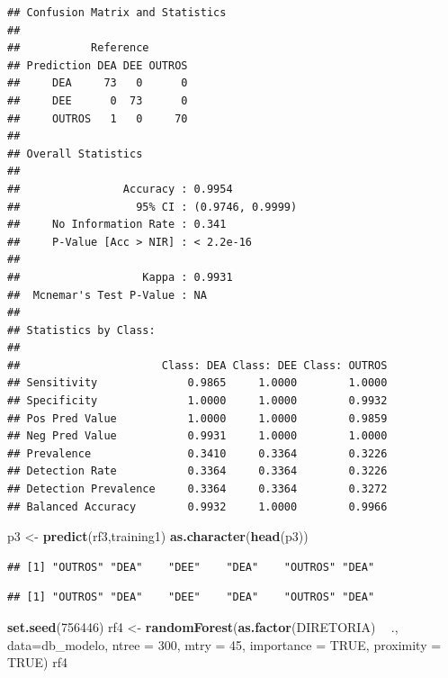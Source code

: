 \documentclass[]{article}
\newenvironment{Shaded}{\begin{snugshade}}{\end{snugshade}}
\newcommand{\KeywordTok}[1]{\textcolor[rgb]{0.13,0.29,0.53}{\textbf{#1}}}
\newcommand{\DataTypeTok}[1]{\textcolor[rgb]{0.13,0.29,0.53}{#1}}
\newcommand{\DecValTok}[1]{\textcolor[rgb]{0.00,0.00,0.81}{#1}}
\newcommand{\StringTok}[1]{\textcolor[rgb]{0.31,0.60,0.02}{#1}}
\newcommand{\OtherTok}[1]{\textcolor[rgb]{0.56,0.35,0.01}{#1}}
\newcommand{\OperatorTok}[1]{\textcolor[rgb]{0.81,0.36,0.00}{\textbf{#1}}}
\newcommand{\NormalTok}[1]{#1}
\begin{document}
\begin{verbatim}
## Confusion Matrix and Statistics
## 
##           Reference
## Prediction DEA DEE OUTROS
##     DEA     73   0      0
##     DEE      0  73      0
##     OUTROS   1   0     70
## 
## Overall Statistics
##                                           
##                Accuracy : 0.9954          
##                  95% CI : (0.9746, 0.9999)
##     No Information Rate : 0.341           
##     P-Value [Acc > NIR] : < 2.2e-16       
##                                           
##                   Kappa : 0.9931          
##  Mcnemar's Test P-Value : NA              
## 
## Statistics by Class:
## 
##                      Class: DEA Class: DEE Class: OUTROS
## Sensitivity              0.9865     1.0000        1.0000
## Specificity              1.0000     1.0000        0.9932
## Pos Pred Value           1.0000     1.0000        0.9859
## Neg Pred Value           0.9931     1.0000        1.0000
## Prevalence               0.3410     0.3364        0.3226
## Detection Rate           0.3364     0.3364        0.3226
## Detection Prevalence     0.3364     0.3364        0.3272
## Balanced Accuracy        0.9932     1.0000        0.9966
\end{verbatim}

\begin{Shaded}
\begin{Highlighting}[]
\NormalTok{p3 <-}\StringTok{ }\KeywordTok{predict}\NormalTok{(rf3,training1)}
\KeywordTok{as.character}\NormalTok{(}\KeywordTok{head}\NormalTok{(p3))}
\end{Highlighting}
\end{Shaded}

\begin{verbatim}
## [1] "OUTROS" "DEA"    "DEE"    "DEA"    "OUTROS" "DEA"
\end{verbatim}

\begin{Shaded}
\end{Shaded}

\begin{verbatim}
## [1] "OUTROS" "DEA"    "DEE"    "DEA"    "OUTROS" "DEA"
\end{verbatim}

\begin{Shaded}
\begin{Highlighting}[]
\KeywordTok{set.seed}\NormalTok{(}\DecValTok{756446}\NormalTok{)}
\NormalTok{rf4 <-}\StringTok{ }\KeywordTok{randomForest}\NormalTok{(}\KeywordTok{as.factor}\NormalTok{(DIRETORIA) }\OperatorTok{~}\StringTok{ }\NormalTok{., }\DataTypeTok{data=}\NormalTok{db_modelo,}
                    \DataTypeTok{ntree =} \DecValTok{300}\NormalTok{,}
                    \DataTypeTok{mtry =} \DecValTok{45}\NormalTok{,}
                    \DataTypeTok{importance =} \OtherTok{TRUE}\NormalTok{,}
                    \DataTypeTok{proximity =} \OtherTok{TRUE}\NormalTok{)}
\NormalTok{rf4}
\end{Highlighting}
\end{Shaded}
\end{document}
